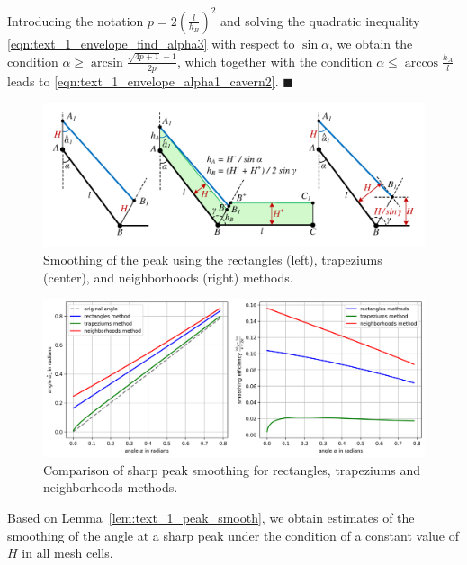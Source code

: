 \documentclass[
11pt,%
tightenlines,%
twoside,%
onecolumn,%
nofloats,%
nobibnotes,%
nofootinbib,%
superscriptaddress,%
noshowpacs,%
centertags]%
{revtex4}
\begin{document}
Introducing the notation $p = 2 \left( \frac{l}{h_B} \right)^2$ and solving the quadratic inequality \eqref{eqn:text_1_envelope_find_alpha3} with respect to $\sin \alpha$, we obtain the condition $\alpha \ge \arcsin \frac{\sqrt{4p + 1} - 1}{2p}$, which together with the condition $\alpha \le \arccos \frac{h_A}{l}$ leads to \eqref{eqn:text_1_envelope_alpha1_cavern2}.
$\blacksquare$\\

\begin{figure}[ht]
\setcaptionmargin{5mm}
\onelinecaptionsfalse %
\includegraphics[width=1.0\textwidth]{./pics/peak-methods.pdf}
\caption{Smoothing of the peak using the rectangles (left), trapeziums (center), and neighborhoods (right) methods.}
\label{fig:text_1_remesh_2d_peak_methods}
\end{figure}

\begin{figure}[ht]
\setcaptionmargin{5mm}
\onelinecaptionstrue  %
\includegraphics[width=1.0\textwidth]{./pics/peak-methods-chart.png}
\caption{Comparison of sharp peak smoothing for rectangles, trapeziums and neighborhoods methods.}
\label{fig:text_1_remesh_2d_peak_methods_chart}
\end{figure}

Based on Lemma~\ref{lem:text_1_peak_smooth}, we obtain estimates of the smoothing of the angle at a sharp peak under the condition of a constant value of $H$ in all mesh cells.
\end{document}
